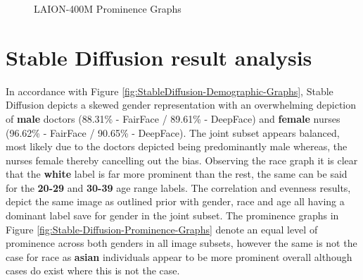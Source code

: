\begin{figure}[H]
\centering  
{}

\caption{LAION-400M Prominence Graphs}\label{fig:LAION-400M-Prominence-Graphs}
\end{figure}


\section{Stable Diffusion result analysis}\label{Eval-StableDiffusion}

In accordance with Figure \ref{fig:StableDiffusion-Demographic-Graphs}, Stable Diffusion depicts a skewed gender representation with an overwhelming depiction of \textbf{male} doctors (88.31\% - FairFace / 89.61\% - DeepFace) and \textbf{female} nurses (96.62\% - FairFace / 90.65\% - DeepFace). The joint subset appears balanced, most likely due to the doctors depicted being predominantly male whereas, the nurses female thereby cancelling out the bias. Observing the race graph it is clear that the \textbf{white} label is far more prominent than the rest, the same can be said for the \textbf{20-29} and \textbf{30-39} age range labels. The correlation and evenness results, depict the same image as outlined prior with gender, race and age all having a dominant label save for gender in the joint subset. The prominence graphs in Figure \ref{fig:Stable-Diffusion-Prominence-Graphs} denote an equal level of prominence across both genders in all image subsets, however the same is not the case for race as \textbf{asian} individuals appear to be more prominent overall although cases do exist where this is not the case.

